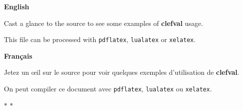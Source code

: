 \documentclass{article}
\begin{document}
\bgroup
\setlength{\parindent}{0pt}
\noindent\hrulefill
\vspace{0.5\baselineskip}

\textbf{English}

Cast a glance to the source to see some examples of \textbf{clefval}
usage.

This file can be processed with \texttt{pdflatex}, \texttt{lualatex}
or \texttt{xelatex}.

\vspace{0.5\baselineskip}
\noindent\hrulefill
\vspace{0.5\baselineskip}

\begin{otherlanguage}{french}
  \textbf{Français}
  
  Jetez un œil sur le source pour voir quelques exemples d'utilisation
  de \textbf{clefval}.

  On peut compiler ce document avec \texttt{pdflatex}, \texttt{lualatex}
  ou \texttt{xelatex}.
\end{otherlanguage}

\vspace{0.5\baselineskip}
\noindent\hrulefill
\egroup

\vspace{\baselineskip}

\(\ast\)%
\(\ast\)




\ifpdftex \else {} \fi

\TheValue{}


\end{document}
